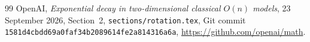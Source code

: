 \documentclass[11pt]{article}
\begin{document}
\begin{thebibliography}{99}
    OpenAI, \emph{Exponential decay in two-dimensional classical
    $O(n)$ models}, 23 September 2026, Section~2,
    \texttt{sections/rotation.tex}, Git commit
    \texttt{1581d4cbdd69a0faf34b2089614fe2a814316a6a},
    \url{https://github.com/openai/math}.
\end{thebibliography}
\end{document}

